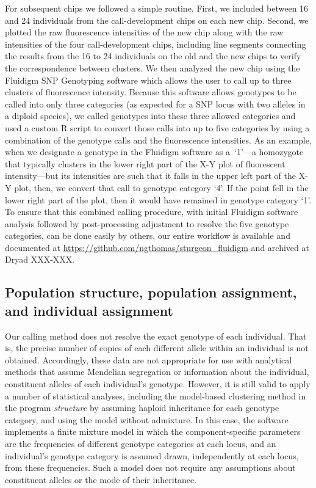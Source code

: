 \documentclass[twocolumn,natbib]{svjour3}       %
\begin{document}
For subsequent chips we followed a simple routine. First, we included between 16
and 24 individuals from the call-development chips on each new chip. Second, we
plotted the raw fluorescence intensities of the new chip along with the raw
intensities of the four call-development chips, including line segments
connecting the results from the 16 to 24 individuals on the old and the new
chips to verify the correspondence between clusters. 
We then analyzed the new chip using the Fluidigm SNP Genotyping
software which allows the user to call up to three clusters of 
fluorescence intensity. Because
this software allows genotypes to be called into only three categories (as
expected for a SNP locus with two alleles in a diploid species), we called genotypes
into these three allowed categories and used a custom R script \citep{RCore2015} 
to convert those calls into up to five categories by using
a combination of the genotype calls and the fluorescence intensities. As
an example, when we designate a genotype in the Fluidigm software as a~`1'---a homozygote that typically clusters
in the lower right part of the X-Y plot of fluorescent intensity---but its
intensities are such that it falls in the upper left part of the X-Y plot, then,
we convert that call to genotype category `4'. If the point fell in
the lower right part of the plot, then it would have remained in genotype
category `1'.  To ensure that this combined calling procedure, with initial
Fluidigm software analysis followed by post-processing adjustment
to resolve the five genotype categories, can be done easily by others, our 
entire workflow is available and documented at 
\url{https://github.com/ngthomas/sturgeon_fluidigm} and archived at Dryad XXX-XXX.


\subsection{Population structure,  population assignment, and individual assignment}

Our calling method does not resolve the exact genotype of each individual. That is, the
precise number of copies of each different allele within an individual is not
obtained. Accordingly, these data are not appropriate for use with analytical
methods that assume Mendelian segregation or information about the individual, 
constituent alleles of each
individual's genotype. However, it is still valid to apply 
a number of statistical analyses, including the model-based clustering method
in the program {\em structure} by assuming haploid inheritance for each genotype category,
and using the model without admixture. 
In this case, the software implements a finite mixture model in which 
the component-specific parameters are the frequencies of different genotype categories
at each locus, and an individual's genotype category is assumed drawn, independently 
at each locus, from these frequencies.  
Such a model does not require any assumptions about
constituent alleles or the mode of their inheritance.
\end{document}
